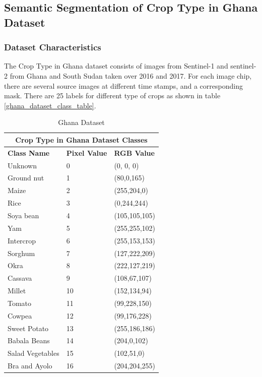 \documentclass[conference]{IEEEtran}
\begin{document}
\subsection{Semantic Segmentation of Crop Type in Ghana Dataset}
\subsubsection{Dataset Characteristics}
The Crop Type in Ghana dataset \cite{Rustowicz2019SemanticSO} consists of images from Sentinel-1 and sentinel-2 from Ghana and South Sudan taken over 2016 and 2017. For each image chip, there are several source images at different time stamps, and a corresponding mask. There are 25 labels for different type of crops as shown in table \ref{ghana_dataset_class_table}.  


\begin{table}[htbp]
\centering
\caption{Ghana Dataset}
\begin{tabular}{|p{2.2cm}|p{0.7cm}|p{1.6cm}|}
 \hline
 \multicolumn{3}{|c|}{\textbf{Crop Type in Ghana Dataset Classes}} \\
 \hline
 \textbf{Class Name} & \textbf{Pixel Value}& \textbf{RGB Value} \\
 \hline
  Unknown & 0  &  (0, 0, 0)\\ 
 \hline
  Ground nut & 1  & (80,0,165) \\ 
 \hline
  Maize & 2  & (255,204,0) \\ 
 \hline
  Rice & 3  & (0,244,244)\\ 
 \hline
  Soya bean & 4  & (105,105,105)\\ 
 \hline
  Yam & 5  & (255,255,102) \\ 
 \hline
  Intercrop & 6  & (255,153,153)\\ 
 \hline
  Sorghum & 7  & (127,222,209)\\ 
 \hline
  Okra & 8  & (222,127,219)\\ 
 \hline
  Cassava & 9  & (108,67,107)\\ 
 \hline
  Millet & 10  & (152,134,94)\\ 
 \hline
  Tomato & 11 & (99,228,150) \\ 
 \hline
  Cowpea & 12  & (99,176,228)\\ 
 \hline
  Sweet Potato & 13 & (255,186,186)\\ 
 \hline
  Babala Beans & 14  & (204,0,102) \\ 
 \hline
  Salad Vegetables & 15  & (102,51,0)\\ 
 \hline
  Bra and Ayolo  & 16  & (204,204,255)\\ 

\end{tabular}
\end{table}
\end{document}
